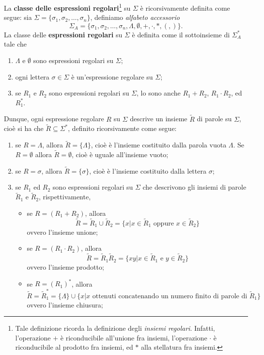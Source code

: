 \documentclass[10pt]{\classname}
\begin{document}
La \textbf{classe delle espressioni regolari}\footnote{Tale definizione ricorda
la definizione degli \emph{insiemi regolari}. Infatti, l'operazione $+$ è
riconducibile all'unione fra insiemi, l'operazione $\cdot$ è riconducibile al
prodotto fra insiemi, ed $*$ alla stellatura fra insiemi.} su $\Sigma$ è
ricorsivamente definita come segue: sia $\Sigma = \{\sigma_1, \sigma_2, \dots,
\sigma_n\}$, definiamo \emph{alfabeto accessorio} $$\Sigma_A = \{\sigma_1,
\sigma_2, \dots, \sigma_n, \Lambda, \emptyset, +, \cdot, *, (, )\}.$$ La classe
delle \textbf{espressioni regolari} su $\Sigma$ è definita come il sottoinsieme
di $\Sigma_A^*$ tale che

\begin{enumerate}
    \item $\Lambda$ e $\emptyset$ sono espressioni regolari su $\Sigma$;
    \item ogni lettera $\sigma \in \Sigma$ è un'espressione regolare su
        $\Sigma$;
    \item se $R_1$ e $R_2$ sono espressioni regolari su $\Sigma$, lo sono anche
        $R_1 + R_2$, $R_1 \cdot R_2$, ed $R_1^*$.
\end{enumerate}

Dunque, ogni espressione regolare $R$ su $\Sigma$ descrive un insieme
$\tilde{R}$ di parole su $\Sigma$, cioè si ha che $\tilde{R}\subseteq
\Sigma^*$, definito ricorsivamente come segue:
\begin{enumerate}
    \item se $R = \Lambda$, allora $\tilde R = \{\Lambda\}$, cioè è l'insieme
        costituito dalla parola vuota $\Lambda$. Se $R = \emptyset$ allora
        $\tilde R = \emptyset$, cioè è uguale all'insieme vuoto;
    \item se $R = \sigma$, allora $\tilde R = \{ \sigma \}$, cioè è l'insieme costituito dalla lettera $\sigma$;
    \item se $R_1$ ed $R_2$ sono espressioni regolari su $\Sigma$ che descrivono gli insiemi di parole $\tilde R_1$ e $\tilde R_2$, rispettivamente,
\begin{itemize}
    \item se $R = (R_1 + R_2)$, allora $$\tilde R = \tilde R_1 \cup \tilde R_2
        = \{x | x \in \tilde R_1 \mbox{ oppure } x \in \tilde R_2\}$$ ovvero
        l'insieme unione;
    \item se $R = (R_1 \cdot R_2)$, allora $$\tilde R = \tilde R_1 \tilde R_2 =
        \{xy | x \in \tilde R_1 \mbox{ e } y \in \tilde R_2\}$$ ovvero
        l'insieme prodotto;
    \item se $R = (R_1)^*$, allora $$\tilde R = \tilde R_1^* =
        \{\Lambda\} \cup \{x | x \mbox{ ottenuti concatenando un numero finito
        di parole di } \tilde R_1\}$$ ovvero l'insieme chiusura;
\end{itemize}
\end{enumerate}
\end{document}
